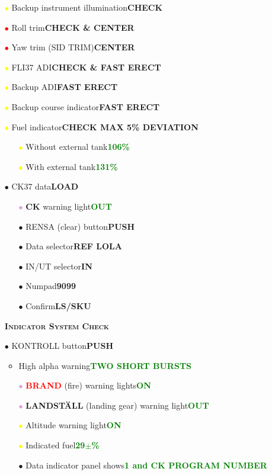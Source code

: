 \documentclass[a4paper,12pt,dvipsnames]{letter}
\newcommand{\rotb}[1]{\textcolor{red}  {\textbf{#1}}}
\newcommand{\oranb}[1]{\textcolor{BurntOrange} {\textbf{#1}}}
\newcommand{\button}[1]{\textbf{#1}}
\newcommand{\ok}[1]{\textcolor{Green}{\textbf{#1}}}
\newcommand{\myhead}[1]{{\Large\textsc{\textbf{#1}}}}
\newcommand{\bi}{\textcolor{ProcessBlue}{$\bullet$\;}}
\newcommand{\ri}{\textcolor{red}{$\bullet$\;}}
\newcommand{\yi}{\textcolor{Yellow}{$\bullet$\;}}
\newcommand{\vi}{\textcolor{Plum}{$\bullet$\;}}
\begin{document}
{\begin{itemize}
 \item[\yi] Backup instrument illumination\dotfill\button{CHECK}
 \item[\ri] Roll trim\dotfill\button{CHECK \& CENTER}
 \item[\ri] Yaw trim (SID TRIM)\dotfill\button{CENTER}
 \item[\yi] FLI37 ADI\dotfill\button{CHECK \& FAST ERECT}
 \item[\yi] Backup ADI\dotfill\button{FAST ERECT}
 \item[\yi] Backup course indicator\dotfill\button{FAST ERECT}
 \item[\yi] Fuel indicator\dotfill\button{CHECK MAX 5\% DEVIATION}
 \begin{itemize}
  \item[\yi] Without external tank\dotfill\ok{106\%}
  \item[\yi] With external tank\dotfill\ok{131\%}
 \end{itemize}
 \item[\bi] CK37 data\dotfill\button{LOAD}
 \begin{itemize}
  \item[\vi] \oranb{CK} warning light\dotfill\ok{OUT}
  \item[\bi] RENSA (clear) button\dotfill\button{PUSH}
  \item[\bi] Data selector\dotfill\button{REF LOLA}
  \item[\bi] IN/UT selector\dotfill\button{IN}
  \item[\bi] Numpad\dotfill\button{9099}
  \item[\bi] Confirm\dotfill\button{LS/SKU}
 \end{itemize}
\end{itemize}
%
\begin{itemize}
 \item[] \myhead{Indicator System Check}
 \item[\bi] KONTROLL button\dotfill\button{PUSH}
 \begin{itemize}
  \item High alpha warning\dotfill\ok{TWO SHORT BURSTS}
  \item[\vi] \rotb{BRAND} (fire) warning lights\dotfill\ok{ON}
  \item[\vi] \oranb{LANDSTÄLL} (landing gear) warning light\dotfill\ok{OUT}
  \item[\yi] Altitude warning light\dotfill\ok{ON}
  \item[\yi] Indicated fuel\dotfill\ok{29\;$\pm$\%}
  \item[\bi] Data indicator panel shows\dotfill\ok{1 and CK PROGRAM NUMBER}

\end{itemize}
\end{itemize}}
\end{document}
